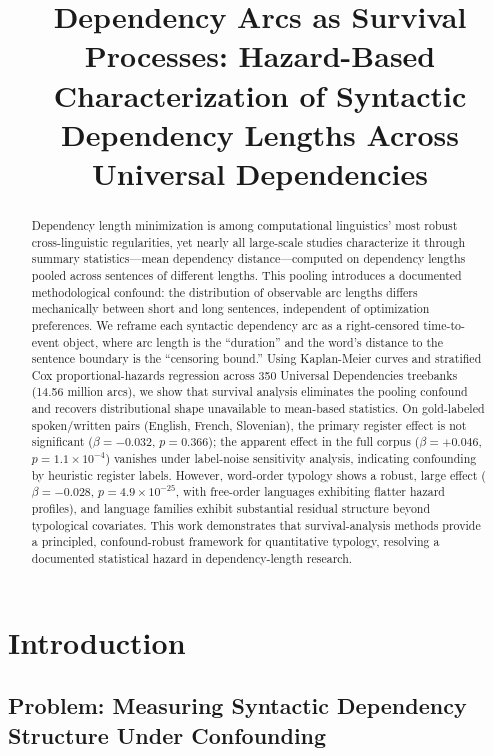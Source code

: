 \documentclass[11pt,letterpaper]{article}
\title{Dependency Arcs as Survival Processes: Hazard-Based Characterization of Syntactic Dependency Lengths Across Universal Dependencies}
\author{}
\date{}
\begin{document}
\maketitle

\begin{abstract}
Dependency length minimization is among computational linguistics' most robust cross-linguistic regularities, yet nearly all large-scale studies characterize it through summary statistics---mean dependency distance---computed on dependency lengths pooled across sentences of different lengths. This pooling introduces a documented methodological confound: the distribution of observable arc lengths differs mechanically between short and long sentences, independent of optimization preferences. We reframe each syntactic dependency arc as a right-censored time-to-event object, where arc length is the ``duration'' and the word's distance to the sentence boundary is the ``censoring bound.'' Using Kaplan-Meier curves and stratified Cox proportional-hazards regression across 350 Universal Dependencies treebanks (14.56 million arcs), we show that survival analysis eliminates the pooling confound and recovers distributional shape unavailable to mean-based statistics. On gold-labeled spoken/written pairs (English, French, Slovenian), the primary register effect is not significant ($\beta=-0.032$, $p=0.366$); the apparent effect in the full corpus ($\beta=+0.046$, $p=1.1\times10^{-4}$) vanishes under label-noise sensitivity analysis, indicating confounding by heuristic register labels. However, word-order typology shows a robust, large effect ($\beta=-0.028$, $p=4.9\times10^{-25}$, with free-order languages exhibiting flatter hazard profiles), and language families exhibit substantial residual structure beyond typological covariates. This work demonstrates that survival-analysis methods provide a principled, confound-robust framework for quantitative typology, resolving a documented statistical hazard in dependency-length research.
\end{abstract}

\section{Introduction}

\subsection{Problem: Measuring Syntactic Dependency Structure Under Confounding}
\end{document}
